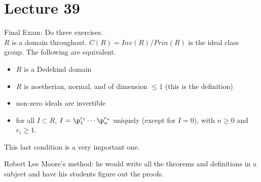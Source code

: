  \section{Lecture 39}

 Final Exam: Do three exercises. \\
 $R$ is a domain throughout. $C(R)=Inv(R)/Prin(R)$ is the ideal class group. The
 following are equivalent.
 \begin{itemize}
   \item $R$ is a Dedekind domain
   \item $R$ is noetherian, normal, and of dimension $\le 1$ (this is the definition)
   \item non-zero ideals are invertible
   \item for all $I\subset R$, $I=\p_1^{r_1}\cdots \p_n^{r_n}$ uniquely (except for $I=0$),
   with $n\ge 0$ and $r_i\ge 1$.
 \end{itemize}
 This last condition is a very important one.

 Robert Lee Moore's method: he would write all the theorems and definitions in a subject and
 have his students figure out the proofs.

